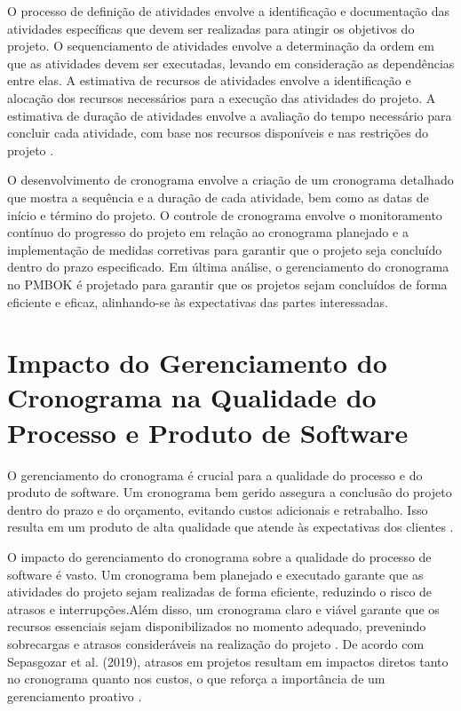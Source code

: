 \documentclass[
	12pt,				%
	oneside,			%
	a4paper,			%
	english,			%
	brazil				%
	]{abntex2unama}
\begin{document}
O processo de definição de atividades envolve a identificação e documentação das atividades específicas que devem ser realizadas para atingir os objetivos do projeto. O sequenciamento de atividades envolve a determinação da ordem em que as atividades devem ser executadas, levando em consideração as dependências entre elas. A estimativa de recursos de atividades envolve a identificação e alocação dos recursos necessários para a execução das atividades do projeto. A estimativa de duração de atividades envolve a avaliação do tempo necessário para concluir cada atividade, com base nos recursos disponíveis e nas restrições do projeto \cite{Project_Management_Institute_PMBOK_2017}.

O desenvolvimento de cronograma envolve a criação de um cronograma detalhado que mostra a sequência e a duração de cada atividade, bem como as datas de início e término do projeto. O controle de cronograma envolve o monitoramento contínuo do progresso do projeto em relação ao cronograma planejado e a implementação de medidas corretivas para garantir que o projeto seja concluído dentro do prazo especificado. Em última análise, o gerenciamento do cronograma no PMBOK é projetado para garantir que os projetos sejam concluídos de forma eficiente e eficaz, alinhando-se às expectativas das partes interessadas.

\chapter{Impacto do Gerenciamento do Cronograma na Qualidade do Processo e Produto de Software}

O gerenciamento do cronograma é crucial para a qualidade do processo e do produto de software. Um cronograma bem gerido assegura a conclusão do projeto dentro do prazo e do orçamento, evitando custos adicionais e retrabalho. Isso resulta em um produto de alta qualidade que atende às expectativas dos clientes \cite{Ghasemabadi_PMBOK_2011}\cite{Gonçalves_Pereira_2012}.

O impacto do gerenciamento do cronograma sobre a qualidade do processo de software é vasto. Um cronograma bem planejado e executado garante que as atividades do projeto sejam realizadas de forma eficiente, reduzindo o risco de atrasos e interrupções.Além disso, um cronograma claro e viável garante que os recursos essenciais sejam disponibilizados no momento adequado, prevenindo sobrecargas e atrasos consideráveis na realização do projeto \cite{Gonçalves_Pereira_2012}. De acordo com Sepasgozar et al. (2019), atrasos em projetos resultam em impactos diretos tanto no cronograma quanto nos custos, o que reforça a importância de um gerenciamento proativo \cite{Sepasgozar_Delay_2019}.
\end{document}
